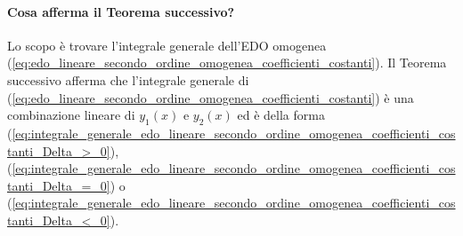 
\paragraph{Cosa afferma il Teorema successivo?} Lo scopo è trovare l'integrale generale dell'EDO omogenea (\ref{eq:edo_lineare_secondo_ordine_omogenea_coefficienti_costanti}). Il Teorema successivo afferma che l'integrale generale di (\ref{eq:edo_lineare_secondo_ordine_omogenea_coefficienti_costanti}) è una combinazione lineare di $y_1(x)$ e $y_2(x)$ ed è della forma (\ref{eq:integrale_generale_edo_lineare_secondo_ordine_omogenea_coefficienti_costanti_Delta_>_0}), (\ref{eq:integrale_generale_edo_lineare_secondo_ordine_omogenea_coefficienti_costanti_Delta_=_0}) o (\ref{eq:integrale_generale_edo_lineare_secondo_ordine_omogenea_coefficienti_costanti_Delta_<_0}). 

